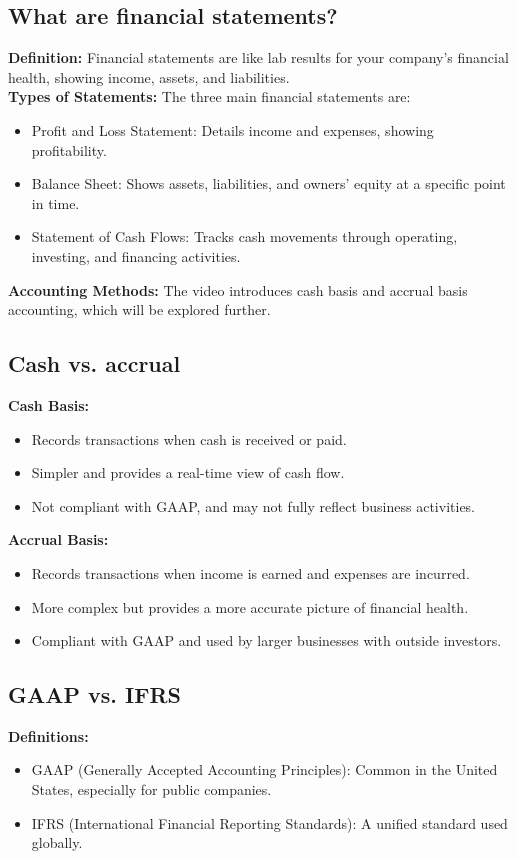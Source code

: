 \documentclass[12pt]{article}
\begin{document}
\subsection{What are financial statements?}
\textbf{Definition:} Financial statements are like lab results for your company's financial health, showing income, assets, and liabilities.\\
\textbf{Types of Statements:} The three main financial statements are:\\
\begin{itemize}
\item Profit and Loss Statement: Details income and expenses, showing profitability.
\item Balance Sheet: Shows assets, liabilities, and owners' equity at a specific point in time.
\item Statement of Cash Flows: Tracks cash movements through operating, investing, and financing activities.
\end{itemize}
\textbf{Accounting Methods:}  The video introduces cash basis and accrual basis accounting, which will be explored further.

\subsection{Cash vs. accrual}
\textbf{Cash Basis:}
\begin{itemize}
\item Records transactions when cash is received or paid.
\item Simpler and provides a real-time view of cash flow.
\item Not compliant with GAAP, and may not fully reflect business activities.
\end{itemize}
\textbf{Accrual Basis:}
\begin{itemize}
\item Records transactions when income is earned and expenses are incurred.
\item More complex but provides a more accurate picture of financial health.
\item Compliant with GAAP and used by larger businesses with outside investors.
\end{itemize}


\subsection{GAAP vs. IFRS}
\textbf{Definitions:}
\begin{itemize}
\item GAAP (Generally Accepted Accounting Principles): Common in the United States, especially for public companies.
\item IFRS (International Financial Reporting Standards): A unified standard used globally.
\end{itemize}
\end{document}
